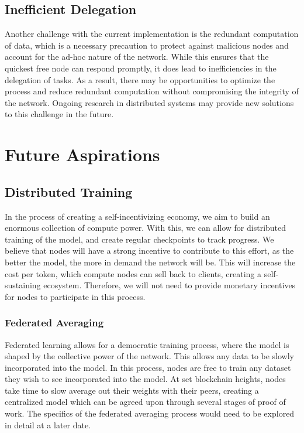 \documentclass{article}
\begin{document}
\subsection{Inefficient Delegation}
Another challenge with the current implementation is the redundant computation of data, which is a necessary precaution to protect against malicious nodes and account for the ad-hoc nature of the network. 
While this ensures that the quickest free node can respond promptly, it does lead to inefficiencies in the delegation of tasks. 
As a result, there may be opportunities to optimize the process and reduce redundant computation without compromising the integrity of the network. Ongoing research in distributed systems may provide new solutions to this challenge in the future.

\section {Future Aspirations}
\subsection{Distributed Training}
In the process of creating a self-incentivizing economy, we aim to build an enormous collection of compute power. 
With this, we can allow for distributed training of the model, and create regular checkpoints to track progress. 
We believe that nodes will have a strong incentive to contribute to this effort, as the better the model, the more in demand the network will be. 
This will increase the cost per token, which compute nodes can sell back to clients, creating a self-sustaining ecosystem. 
Therefore, we will not need to provide monetary incentives for nodes to participate in this process.

\subsubsection {Federated Averaging}
Federated learning allows for a democratic training process, where the model is shaped by the collective power of the network. 
This allows any data to be slowly incorporated into the model. 
In this process, nodes are free to train any dataset they wish to see incorporated into the model. At set blockchain heights, nodes take time to slow average out their weights with their peers, creating a centralized model which can be agreed upon through several stages of proof of work. 
The specifics of the federated averaging process would need to be explored in detail at a later date.
\end{document}
